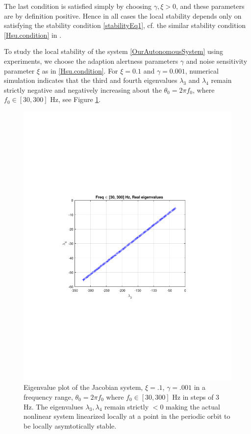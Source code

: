 \documentclass{UCF_ETD}
\begin{document}
The last condition is satisfied simply by choosing $\gamma, \xi > 0$, and these parameters are by definition positive. Hence in all cases the local stability depends only on satisfying the stability condition \eqref{stabilityEq1}, cf.  the similar stability condition \eqref{Hsu.condition}  in \cite{hsuortegadamm99}. 
 
To study the local stability of the system
\eqref{OurAutonomousSystem} using experiments, we choose the  adaption alertness parameters $\gamma$ and noise sensitivity parameter $\xi$ as in \eqref{Hsu.condition}. For  $\xi =0.1$ and $\gamma =0.001$,
numerical simulation indicates that  the third and fourth eigenvalues $\lambda_3$ and $\lambda_4$ remain strictly negative and negatively increasing
about the $\theta_0 = 2\pi f_0$, where $f_0 \in [30,300]$ Hz, see Figure \ref{EigenValueAnalysis.fig}.

\begin{figure}[H]
\begin{center}
\includegraphics[scale=0.9]{NonuniformANF/VerySpecialEigenvaluesFinal}
\caption{Eigenvalue plot of the Jacobian system, $\xi = .1$, $\gamma = .001$ in a frequency range, $\theta_0 = 2\pi f_0$ where $f_0 \in [30,300]$ Hz in steps of $3$ Hz. The eigenvalues $\lambda_3,\lambda_4$ remain strictly $< 0$ making the actual nonlinear system linearized locally at a point in the periodic orbit to be locally asymtotically stable.}
\label{EigenValueAnalysis.fig}
\end{center}
\end{figure}
\end{document}
